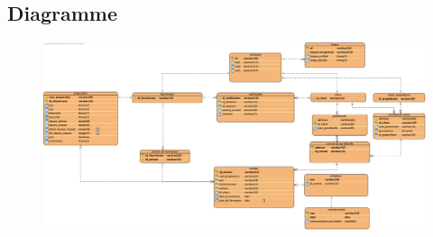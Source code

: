 \newpage
\subsection{Diagramme}
\begin{figure}[h]
\centering
\includegraphics[width = 1\textwidth]{Extension-claire/BDD-claire/img/BDD-claire.png}
\end{figure}
